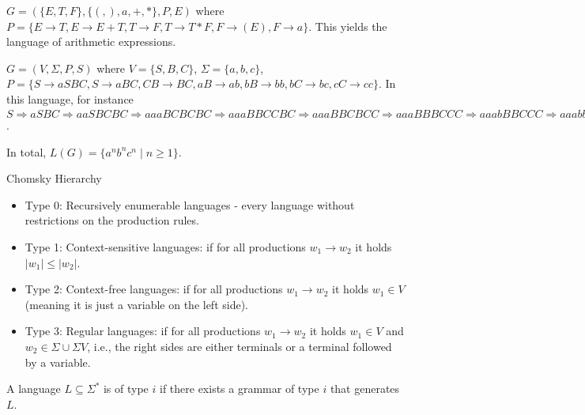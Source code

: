 \documentclass{beamer}
\begin{document}
\begin{frame}
    \begin{example}
        $G=(\{E,T,F\},\{(,),a,+,*\},P,E)$ where $P=\{E\to T, E\to E+T, T\to F, T\to T*F, F\to (E), F\to a\}$. This yields the language of arithmetic expressions.
    \end{example}
\end{frame}

\begin{frame}
    \begin{example}
        $G=(V,\Sigma,P,S)$ where $V=\{S,B,C\}$, $\Sigma=\{a,b,c\}$, $P=\{S\to aSBC, S\to aBC, CB\to BC, aB\to ab, bB\to bb, bC\to bc, cC\to cc\}$.
        In this language, for instance $S\Rightarrow aSBC\Rightarrow aaSBCBC\Rightarrow aaaBCBCBC\Rightarrow aaaBBCCBC\Rightarrow aaaBBCBCC\Rightarrow aaaBBBCCC\Rightarrow aaabBBCCC\Rightarrow aaabbBCCC\Rightarrow aaabbbCCC\Rightarrow aaaabbbcCC\Rightarrow aaabbbccC\Rightarrow aaabbbccc=a^3b^3c^3$. 

        In total, $L(G)=\{a^nb^nc^n\mid n\geq 1\}$.
    \end{example}
\end{frame}

\begin{frame}{Chomsky Hierarchy}
    \begin{itemize}
        \item Type 0: Recursively enumerable languages - every language without restrictions on the production rules.
        \item Type 1: Context-sensitive languages: if for all productions $w_1\to w_2$ it holds $|w_1|\leq |w_2|$.
        \item Type 2: Context-free languages: if for all productions $w_1\to w_2$ it holds $w_1\in V$ (meaning it is just a variable on the left side).
        \item Type 3: Regular languages: if for all productions $w_1\to w_2$ it holds $w_1\in V$ and $w_2\in \Sigma\cup \Sigma V$, i.e., the right sides are either terminals or a terminal followed by a variable.
    \end{itemize}
    A language $L\subseteq \Sigma^*$ is of type $i$ if there exists a grammar of type $i$ that generates $L$.
\end{frame}
\end{document}
